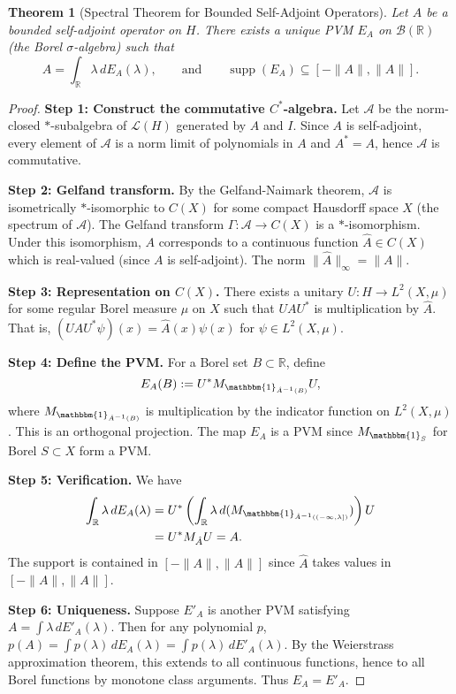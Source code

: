 \documentclass[11pt]{article}
\newtheorem{theorem}{Theorem}[section]
\theoremstyle{definition}
\theoremstyle{remark}
\newcommand{\R}{\mathbb{R}}
\newcommand{\1}{\mathbbm{1}}
\DeclareMathOperator{\supp}{supp}
\begin{document}
\begin{theorem}[Spectral Theorem for Bounded Self-Adjoint Operators]\label{thm:spectral_bounded}
Let $A$ be a bounded self-adjoint operator on $H$. There exists a unique PVM $E_A$ on $\mathcal{B}(\R)$ (the Borel $\sigma$-algebra) such that
\[
A=\int_{\R}\lambda\,dE_A(\lambda),\qquad\text{and}\qquad \supp(E_A)\subseteq[-\|A\|,\|A\|].
\]
\end{theorem}

\begin{proof}
\textbf{Step 1: Construct the commutative $C^*$-algebra.}
Let $\mathcal{A}$ be the norm-closed $*$-subalgebra of $\mathcal{L}(H)$ generated by $A$ and $I$. Since $A$ is self-adjoint, every element of $\mathcal{A}$ is a norm limit of polynomials in $A$ and $A^*=A$, hence $\mathcal{A}$ is commutative.

\textbf{Step 2: Gelfand transform.}
By the Gelfand-Naimark theorem, $\mathcal{A}$ is isometrically $*$-isomorphic to $C(X)$ for some compact Hausdorff space $X$ (the spectrum of $\mathcal{A}$). The Gelfand transform $\Gamma:\mathcal{A}\to C(X)$ is a $*$-isomorphism. Under this isomorphism, $A$ corresponds to a continuous function $\hat{A}\in C(X)$ which is real-valued (since $A$ is self-adjoint). The norm $\|\hat{A}\|_\infty=\|A\|$.

\textbf{Step 3: Representation on $C(X)$.}
There exists a unitary $U:H\to L^2(X,\mu)$ for some regular Borel measure $\mu$ on $X$ such that $UAU^*$ is multiplication by $\hat{A}$. That is, $(UAU^*\psi)(x)=\hat{A}(x)\psi(x)$ for $\psi\in L^2(X,\mu)$.

\textbf{Step 4: Define the PVM.}
For a Borel set $B\subset\R$, define
\[
E_A(B):=U^*M_{\1_{\hat{A}^{-1}(B)}}U,
\]
where $M_{\1_{\hat{A}^{-1}(B)}}$ is multiplication by the indicator function on $L^2(X,\mu)$. This is an orthogonal projection. The map $E_A$ is a PVM since $M_{\1_S}$ for Borel $S\subset X$ form a PVM.

\textbf{Step 5: Verification.}
We have
\begin{align*}
\int_{\R}\lambda\,dE_A(\lambda)&=U^*\left(\int_{\R}\lambda\,d(M_{\1_{\hat{A}^{-1}((-\infty,\lambda])}})\right)U\\
&=U^* M_{\hat{A}}U=A.
\end{align*}
The support is contained in $[-\|A\|,\|A\|]$ since $\hat{A}$ takes values in $[-\|A\|,\|A\|]$.

\textbf{Step 6: Uniqueness.}
Suppose $E'_A$ is another PVM satisfying $A=\int\lambda\,dE'_A(\lambda)$. Then for any polynomial $p$, $p(A)=\int p(\lambda)\,dE_A(\lambda)=\int p(\lambda)\,dE'_A(\lambda)$. By the Weierstrass approximation theorem, this extends to all continuous functions, hence to all Borel functions by monotone class arguments. Thus $E_A=E'_A$.
\end{proof}
\end{document}

